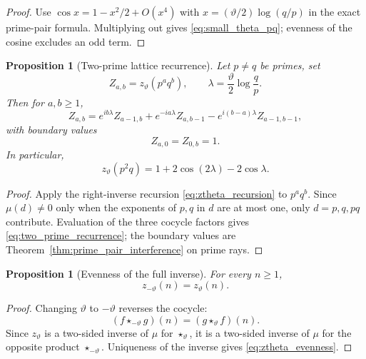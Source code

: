 \documentclass[11pt]{amsart}
\numberwithin{equation}{section}
\theoremstyle{plain}
\newtheorem{proposition}[theorem]{Proposition}
\theoremstyle{definition}
\theoremstyle{remark}
\begin{document}
\begin{proof}
Use \(\cos x=1-x^2/2+O(x^4)\) with
\(x=(\vartheta/2)\log(q/p)\) in the exact prime-pair formula.  Multiplying
out gives \eqref{eq:small_theta_pq}; evenness of the cosine excludes an odd
term.
\end{proof}

\begin{proposition}[Two-prime lattice recurrence]
\label{prop:two_prime_recurrence}
Let \(p\ne q\) be primes, set
\begin{equation}
Z_{a,b}=z_\vartheta(p^aq^b),
\qquad
\lambda=\frac{\vartheta}{2}\log\frac{q}{p}.
\label{eq:Zab_lambda}
\end{equation}
Then for \(a,b\ge1\),
\begin{equation}
Z_{a,b}
=
e^{ib\lambda}Z_{a-1,b}
+e^{-ia\lambda}Z_{a,b-1}
-e^{i(b-a)\lambda}Z_{a-1,b-1},
\label{eq:two_prime_recurrence}
\end{equation}
with boundary values
\begin{equation}
Z_{a,0}=Z_{0,b}=1.
\label{eq:two_prime_boundary}
\end{equation}
In particular,
\begin{equation}
z_\vartheta(p^2q)
=1+2\cos(2\lambda)-2\cos\lambda.
\label{eq:p2q_formula}
\end{equation}
\end{proposition}

\begin{proof}
Apply the right-inverse recursion \eqref{eq:ztheta_recursion} to
\(p^aq^b\).  Since \(\mu(d)\neq0\) only when the exponents of \(p,q\)
in \(d\) are at most one, only \(d=p,q,pq\) contribute.  Evaluation of
the three cocycle factors gives \eqref{eq:two_prime_recurrence}; the boundary
values are Theorem~\ref{thm:prime_pair_interference} on prime rays.
\end{proof}

\begin{proposition}[Evenness of the full inverse]
\label{prop:theta_evenness}
For every $n\ge1$,
\begin{equation}
z_{-\vartheta}(n)=z_{\vartheta}(n).
\label{eq:ztheta_evenness}
\end{equation}
\end{proposition}

\begin{proof}
Changing $\vartheta$ to $-\vartheta$ reverses the cocycle:
\begin{equation}
(f\star_{-\vartheta}g)(n)
=
(g\star_{\vartheta}f)(n).
\label{eq:opposite_algebra_identity}
\end{equation}
Since $z_{\vartheta}$ is a two-sided inverse of $\mu$ for
$\star_{\vartheta}$, it is a two-sided inverse of $\mu$ for the opposite
product $\star_{-\vartheta}$.  Uniqueness of the inverse gives
\eqref{eq:ztheta_evenness}.
\end{proof}
\end{document}
